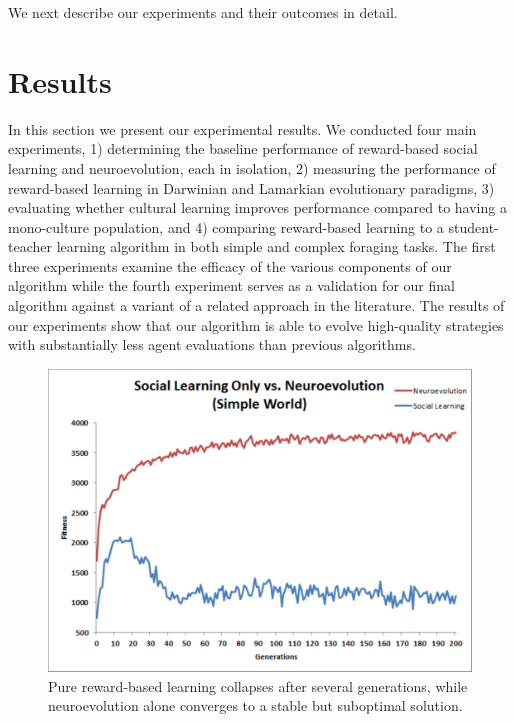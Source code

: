 \documentclass{acm_proc_article-sp}
\begin{document}
We next describe our experiments and their outcomes in detail.


\section{Results}
\label{sec:results}
In this section we present our experimental results. We conducted four main experiments, 1) determining the baseline performance of reward-based social learning and neuroevolution, each in isolation, 2) measuring the performance of reward-based learning in Darwinian and Lamarkian evolutionary paradigms, 3) evaluating whether cultural learning improves performance compared to having a mono-culture population, and 4) comparing reward-based learning to a student-teacher learning algorithm in both simple and complex foraging tasks. The first three experiments examine the efficacy of the various components of our algorithm while the fourth experiment serves as a validation for our final algorithm against a variant of a related approach in the literature. The results of our experiments show that our algorithm is able to evolve high-quality strategies with substantially less agent evaluations than previous algorithms.


\begin{figure}
  \centering
    \includegraphics[scale=.35]{social_learning_vs_neuroevolution.pdf}
  \caption{Pure reward-based learning collapses after several generations, while neuroevolution alone converges to a stable but suboptimal solution.}
  \label{fig:social-neuro}
\end{figure}
\end{document}
